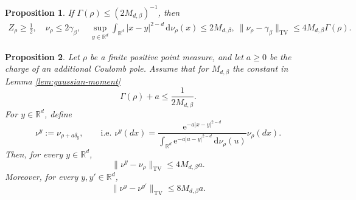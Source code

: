 \documentclass[10pt,a4paper]{amsart}
\newtheorem{proposition}{Proposition}
\newcommand{\R}{\mathbb R}
\newcommand{\TV}{\mathrm{TV}}
\newcommand{\be}{\beta}
\newcommand{\dd}{\,\mathrm d}
\newcommand{\ee}{\mathrm e}
\begin{document}
\begin{proposition}
\label{prop:basic-onesite}
If \(\Gamma(\rho)\le(2M_{d,\be})^{-1}\), then
\[
 \begin{gathered}
 Z_{\rho}\ge\tfrac12,\quad
 \nu_{\rho}\le2\gamma_\be,\quad
 \sup_{y\in\R^d}\int_{\R^d}|x-y|^{2-d}\dd\nu_{\rho}(x)
 \le2M_{d,\be}, \ \|\nu_{\rho}-\gamma_\be\|_{\TV}
 \le4M_{d,\be}\Gamma(\rho).
 \end{gathered}
\]
\end{proposition}

\begin{proposition}
\label{prop:moving-center}
Let \(\rho\) be a finite positive point measure, and let \(a\ge0\) be the
charge of an additional Coulomb pole.  Assume that for $M_{d,\beta}$ the constant in Lemma \ref{lem:gaussian-moment}
\[
 \Gamma(\rho)+a\le\frac{1}{2M_{d,\be}}.
\]
For \(y\in\R^d\), define
\[
 \nu^y:=\nu_{\rho+a\delta_y}, \qquad\text{i.e. }
 \nu^y(dx)
 =
 \frac{\ee^{-a|x-y|^{2-d}}}{
   \int_{\R^d}\ee^{-a|u-y|^{2-d}}\dd\nu_\rho(u)}
 \nu_\rho(dx).
\]
Then, for every \(y\in\R^d\),
\begin{equation}\label{eq:add-remove-TV}
 \|\nu^y-\nu_\rho\|_{\TV}
 \le4M_{d,\be}a.
\end{equation}
Moreover, for every \(y,y'\in\R^d\),
\begin{equation}\label{eq:move-TV}
 \|\nu^y-\nu^{y'}\|_{\TV}
 \le8M_{d,\be}a.
\end{equation}
\end{proposition}
\end{document}
